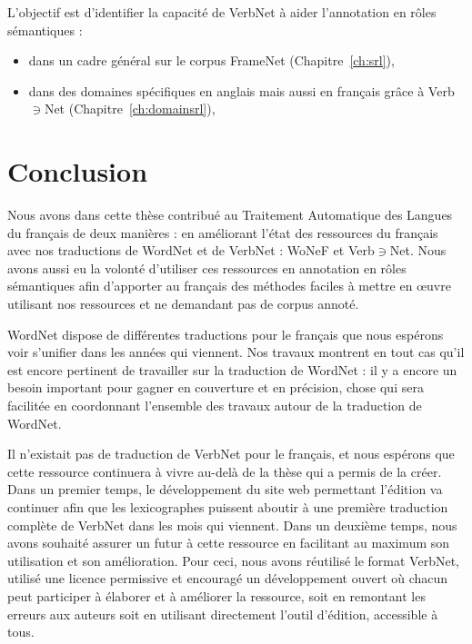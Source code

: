 \documentclass[oneside,parskip]{scrbook}
\newcommand{\verbenet}{Verb$\ni$Net}
\begin{document}
L'objectif est d'identifier la capacité de VerbNet à aider l'annotation en
rôles sémantiques :
\begin{itemize}
    \item dans un cadre général sur le corpus FrameNet (Chapitre~\ref{ch:srl}),
    \item dans des domaines spécifiques en anglais mais aussi en français grâce
        à \verbenet{} (Chapitre~\ref{ch:domainsrl}),
\end{itemize}





\chapter{Conclusion}
\label{ch:conc}

Nous avons dans cette thèse contribué au Traitement Automatique des Langues du
français de deux manières : en améliorant l'état des ressources du français
avec nos traductions de WordNet et de VerbNet : WoNeF et \verbenet{}. Nous
avons aussi eu la volonté d'utiliser ces ressources en annotation en rôles
sémantiques afin d'apporter au français des méthodes faciles à mettre en œuvre
utilisant nos ressources et ne demandant pas de corpus annoté.

WordNet dispose de différentes traductions pour le français que nous espérons
voir s'unifier dans les années qui viennent. Nos travaux montrent en tout cas
qu'il est encore pertinent de travailler sur la traduction de WordNet : il y a
encore un besoin important pour gagner en couverture et en précision, chose
qui sera facilitée en coordonnant l'ensemble des travaux autour de la
traduction de WordNet.

Il n'existait pas de traduction de VerbNet pour le français, et nous espérons
que cette ressource continuera à vivre au-delà de la thèse qui a permis de la
créer. Dans un premier temps, le développement du site web permettant l'édition
va continuer afin que les lexicographes puissent aboutir à une première
traduction complète de VerbNet dans les mois qui viennent. Dans un deuxième
temps, nous avons souhaité assurer un futur à cette ressource en facilitant au
maximum son utilisation et son amélioration. Pour ceci, nous avons réutilisé le
format VerbNet, utilisé une licence permissive et encouragé un développement
ouvert où chacun peut participer à élaborer et à améliorer la ressource, soit
en remontant les erreurs aux auteurs soit en utilisant directement l'outil
d'édition, accessible à tous.
\end{document}
